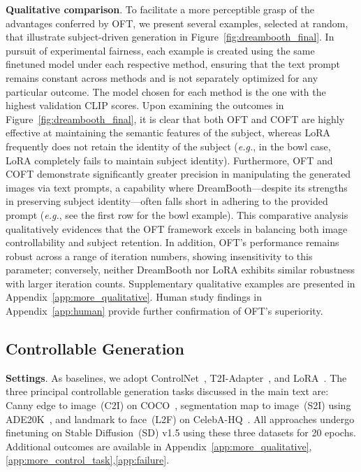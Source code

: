 \textbf{Qualitative comparison}. To facilitate a more perceptible grasp of the advantages conferred by OFT, we present several examples, selected at random, that illustrate subject-driven generation in Figure~\ref{fig:dreambooth_final}. In pursuit of experimental fairness, each example is created using the same finetuned model under each respective method, ensuring that the text prompt remains constant across methods and is not separately optimized for any particular outcome. The model chosen for each method is the one with the highest validation CLIP scores. Upon examining the outcomes in Figure~\ref{fig:dreambooth_final}, it is clear that both OFT and COFT are highly effective at maintaining the semantic features of the subject, whereas LoRA frequently does not retain the identity of the subject (\emph{e.g.}, in the bowl case, LoRA completely fails to maintain subject identity). Furthermore, OFT and COFT demonstrate significantly greater precision in manipulating the generated images via text prompts, a capability where DreamBooth—despite its strengths in preserving subject identity—often falls short in adhering to the provided prompt (\emph{e.g.}, see the first row for the bowl example). This comparative analysis qualitatively evidences that the OFT framework excels in balancing both image controllability and subject retention. In addition, OFT's performance remains robust across a range of iteration numbers, showing insensitivity to this parameter; conversely, neither DreamBooth nor LoRA exhibits similar robustness with larger iteration counts. Supplementary qualitative examples are presented in Appendix~\ref{app:more_qualitative}. Human study findings in Appendix~\ref{app:human} provide further confirmation of OFT's superiority.

\subsection{Controllable Generation}

\textbf{Settings}. As baselines, we adopt ControlNet~\cite{zhang2023adding}, T2I-Adapter~\cite{mou2023t2i}, and LoRA~\cite{hulora2022}. The three principal controllable generation tasks discussed in the main text are: Canny edge to image~(C2I) on COCO~\cite{lin2014microsoft}, segmentation map to image~(S2I) using ADE20K~\cite{zhou2017scene}, and landmark to face~(L2F) on CelebA-HQ~\cite{karras2018progressive,xia2021tedigan}. All approaches undergo finetuning on Stable Diffusion~(SD) v1.5 using these three datasets for 20 epochs. Additional outcomes are available in Appendix~\ref{app:more_qualitative},\ref{app:more_control_task},\ref{app:failure}.

